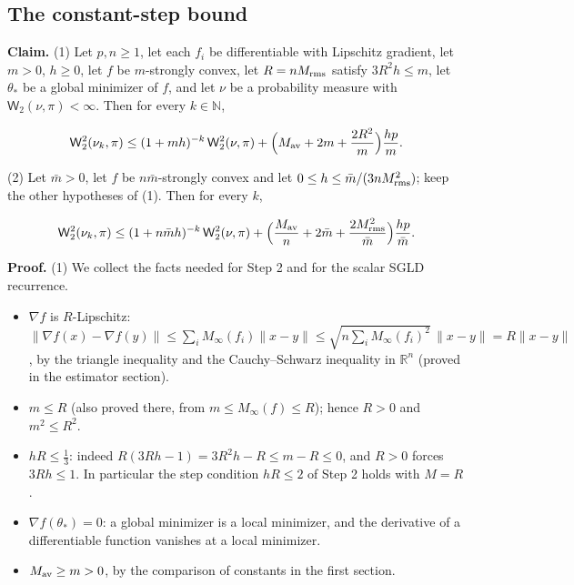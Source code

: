 \documentclass[11pt,a4paper]{report}
\begin{document}
\subsection{\texorpdfstring{The constant-step bound}{The constant-step bound}}
\label{report-step-AverageLMC-SGLDTheorem-lean-3}


\textbf{Claim.} (1) Let \(p,n\ge1\), let each \(f_i\) be differentiable with Lipschitz gradient, let \(m>0\), \(h\ge0\), let \(f\) be \(m\)-strongly convex, let \(R=nM_{\rm rms}\) satisfy \(3R^2h\le m\), let \(\theta_*\) be a global minimizer of \(f\), and let \(\nu\) be a probability measure with \(\mathsf W_2(\nu,\pi)<\infty\). Then for every \(k\in\mathbb N\),


\[\mathsf W_2^2(\nu_k,\pi)\le(1+mh)^{-k}\,\mathsf W_2^2(\nu,\pi)+\Bigl(M_{\rm av}+2m+\frac{2R^2}m\Bigr)\frac{hp}m.\]


(2) Let \(\bar m>0\), let \(f\) be \(n\bar m\)-strongly convex and let \(0\le h\le\bar m/(3nM_{\rm rms}^2)\); keep the other hypotheses of (1). Then for every \(k\),


\[\mathsf W_2^2(\nu_k,\pi)\le(1+n\bar mh)^{-k}\,\mathsf W_2^2(\nu,\pi)+\Bigl(\frac{M_{\rm av}}n+2\bar m+\frac{2M_{\rm rms}^2}{\bar m}\Bigr)\frac{hp}{\bar m}.\]


\textbf{Proof.} (1) We collect the facts needed for Step 2 and for the scalar SGLD recurrence.



\begin{itemize}


\item \(\nabla f\) is \(R\)-Lipschitz: \(\|\nabla f(x)-\nabla f(y)\|\le\sum_iM_\infty(f_i)\|x-y\|\le\sqrt{n\sum_iM_\infty(f_i)^2}\,\|x-y\|=R\|x-y\|\), by the triangle inequality and the Cauchy–Schwarz inequality in \(\mathbb R^n\) (proved in the estimator section).

\item \(m\le R\) (also proved there, from \(m\le M_\infty(f)\le R\)); hence \(R>0\) and \(m^2\le R^2\).

\item \(hR\le\frac13\): indeed \(R(3Rh-1)=3R^2h-R\le m-R\le0\), and \(R>0\) forces \(3Rh\le1\). In particular the step condition \(hR\le2\) of Step 2 holds with \(M=R\).

\item \(\nabla f(\theta_*)=0\): a global minimizer is a local minimizer, and the derivative of a differentiable function vanishes at a local minimizer.

\item \(M_{\rm av}\ge m>0\), by the comparison of constants in the first section.

\end{itemize}
\end{document}
